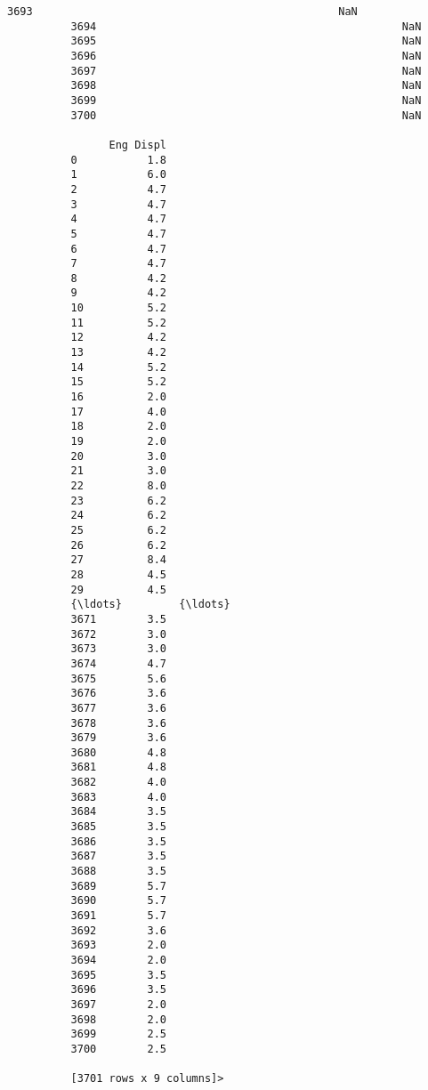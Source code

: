\documentclass[11pt]{article}
\begin{document}
\begin{Verbatim}[commandchars=\\\{\}]
          3693                                                NaN                               
          3694                                                NaN                               
          3695                                                NaN                               
          3696                                                NaN                               
          3697                                                NaN                               
          3698                                                NaN                               
          3699                                                NaN                               
          3700                                                NaN                               
          
                Eng Displ  
          0           1.8  
          1           6.0  
          2           4.7  
          3           4.7  
          4           4.7  
          5           4.7  
          6           4.7  
          7           4.7  
          8           4.2  
          9           4.2  
          10          5.2  
          11          5.2  
          12          4.2  
          13          4.2  
          14          5.2  
          15          5.2  
          16          2.0  
          17          4.0  
          18          2.0  
          19          2.0  
          20          3.0  
          21          3.0  
          22          8.0  
          23          6.2  
          24          6.2  
          25          6.2  
          26          6.2  
          27          8.4  
          28          4.5  
          29          4.5  
          {\ldots}         {\ldots}  
          3671        3.5  
          3672        3.0  
          3673        3.0  
          3674        4.7  
          3675        5.6  
          3676        3.6  
          3677        3.6  
          3678        3.6  
          3679        3.6  
          3680        4.8  
          3681        4.8  
          3682        4.0  
          3683        4.0  
          3684        3.5  
          3685        3.5  
          3686        3.5  
          3687        3.5  
          3688        3.5  
          3689        5.7  
          3690        5.7  
          3691        5.7  
          3692        3.6  
          3693        2.0  
          3694        2.0  
          3695        3.5  
          3696        3.5  
          3697        2.0  
          3698        2.0  
          3699        2.5  
          3700        2.5  
          
          [3701 rows x 9 columns]>
\end{Verbatim}
        
\end{document}
